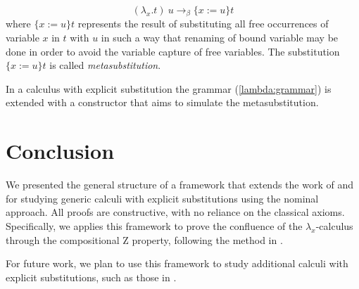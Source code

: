\documentclass{llncs}
\newcommand{\metasub}[3]{\{ #2 := #3 \}#1}
\begin{document}
\begin{equation}\label{lambda:beta}
 (\lambda_x.t)\ u \to_{\beta} \metasub{t}{x}{u}
\end{equation}
\noindent where $\metasub{t}{x}{u}$ represents the result of substituting all free occurrences of variable $x$ in $t$ with $u$ in such a way that renaming of bound variable may be done in order to avoid the variable capture of free variables. The substitution $\metasub{t}{x}{u}$ is called \emph{metasubstitution}.

In a calculus with explicit substitution the grammar (\ref{lambda:grammar}) is extended with a constructor that aims to simulate the metasubstitution.

%


\section{Conclusion}

We presented the general structure of a framework that extends the work of \cite{fmm2021} and \cite{limaFormalizedExtensionSubstitution2023} for studying generic calculi with explicit substitutions using the nominal approach. All proofs are constructive, with no reliance on the classical axioms. Specifically, we applies this framework to prove the confluence of the $\lambda_x$-calculus through the compositional Z property, following the method in \cite{nakazawaCompositionalConfluenceProofs2016}.

For future work, we plan to use this framework to study additional calculi with explicit substitutions, such as those in \cite{nakazawaPropertyShufflingCalculus2023,kesnerTheoryExplicitSubstitutions2009a,nakazawaCallbyvalue2017,hondaConfluenceProofsLambdaMuCalculi2021}.


 
\end{document}
